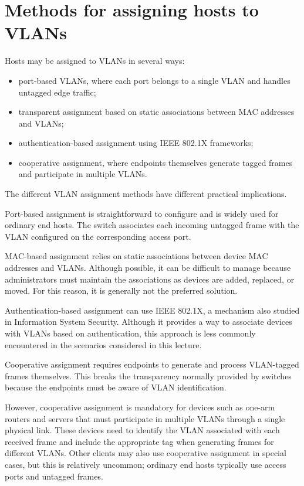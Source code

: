 \section{Methods for assigning hosts to VLANs}

Hosts may be assigned to VLANs in several ways:

\begin{itemize}
	\item port-based VLANs, where each port belongs to a single VLAN and handles untagged edge traffic;
	\item transparent assignment based on static associations between MAC addresses and VLANs;
	\item authentication-based assignment using IEEE 802.1X frameworks;
	\item cooperative assignment, where endpoints themselves generate tagged frames and participate in multiple VLANs.
\end{itemize}

The different VLAN assignment methods have different practical implications.

Port-based assignment is straightforward to configure and is widely used for ordinary end hosts. The switch associates each incoming untagged frame with the VLAN configured on the corresponding access port.

MAC-based assignment relies on static associations between device MAC addresses and VLANs. Although possible, it can be difficult to manage because administrators must maintain the associations as devices are added, replaced, or moved. For this reason, it is generally not the preferred solution.

Authentication-based assignment can use IEEE 802.1X, a mechanism also studied in Information System Security. Although it provides a way to associate devices with VLANs based on authentication, this approach is less commonly encountered in the scenarios considered in this lecture.

Cooperative assignment requires endpoints to generate and process VLAN-tagged frames themselves. This breaks the transparency normally provided by switches because the endpoints must be aware of VLAN identification.

However, cooperative assignment is mandatory for devices such as one-arm routers and servers that must participate in multiple VLANs through a single physical link. These devices need to identify the VLAN associated with each received frame and include the appropriate tag when generating frames for different VLANs. Other clients may also use cooperative assignment in special cases, but this is relatively uncommon; ordinary end hosts typically use access ports and untagged frames.

